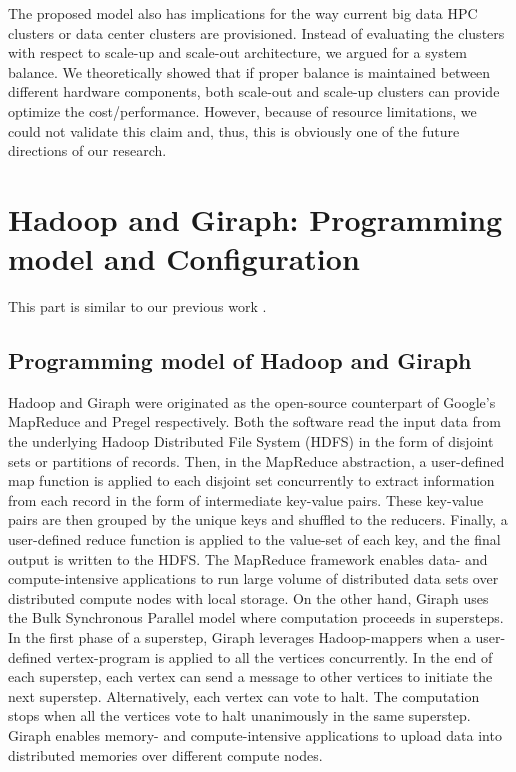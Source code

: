 \documentclass[journal]{IEEEtran}
\begin{document}
The proposed model also has implications for the way current big data HPC clusters or data center clusters are provisioned. Instead of evaluating the clusters with respect to scale-up and scale-out architecture, we argued for a system balance. We theoretically showed that if proper balance is maintained between different hardware components, both scale-out and scale-up clusters can provide optimize the cost/performance.  However, because of resource limitations, we could not validate this claim and, thus, this is obviously one of the future directions of our research.

\appendices
\section{Hadoop and Giraph: Programming model and Configuration}
This part is similar to our previous work \cite{scaleupscaleout:das2015evaluating}.
 \label{app:HadoopConfigurationsAndoptimizations}
\subsection{Programming model of Hadoop and Giraph}
Hadoop and Giraph were originated as the open-source counterpart of Google's MapReduce \cite{fw:mapreduce} and Pregel \cite{fw:pregel} respectively. Both the software read the input data from the underlying Hadoop Distributed File System (HDFS) in the form of disjoint sets or partitions of records. Then, in the MapReduce abstraction, a user-defined map function is applied to each disjoint set concurrently to extract information from each record in the form of intermediate key-value pairs. These key-value pairs are then grouped by the unique keys and shuffled to the reducers. Finally, a user-defined reduce function is applied to the value-set of each key, and the final output is written to the HDFS. The MapReduce framework enables data- and compute-intensive applications to run large volume of distributed data sets over distributed compute nodes with local storage. On the other hand, Giraph uses the Bulk Synchronous Parallel model \cite{fw:bsp} where computation proceeds in supersteps. In the first phase of a superstep, Giraph leverages Hadoop-mappers when a user-defined vertex-program is applied to all the vertices concurrently. In the end of each superstep, each vertex can send a message to other vertices to initiate the next superstep. Alternatively, each vertex can vote to halt. The computation stops when all the vertices vote to halt unanimously in the same superstep. Giraph enables memory- and compute-intensive applications to upload data into distributed memories over different compute nodes.
 
\end{document}
